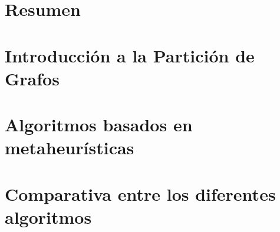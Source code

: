 \documentclass[a4paper,10pt,twoside]{report}
\author{\me}
\begin{document}


\normalsize

\chapter*{Resumen}\label{chapter:Resumen}
\setcounter{page}{0}


\tableofcontents

\chapter{Introducción a la Partición de Grafos}\label{chapter:Introducción}


\chapter{Algoritmos basados en metaheurísticas}\label{chapter:Algoritmos}


%

%

\chapter{Comparativa entre los diferentes algoritmos}\label{chapter:Comparativa}






%
\end{document}
